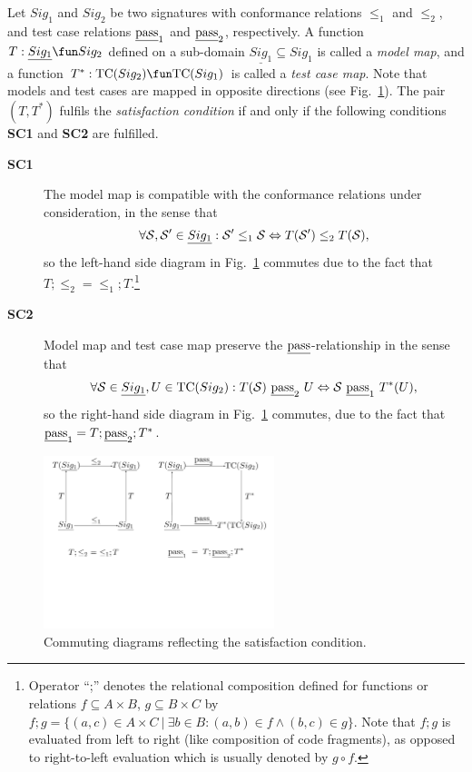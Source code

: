 Let $Sig_1$ and $Sig_2$ be two signatures with conformance relations $\le_1$ and $\le_2$,
and test case relations $\underline{\text{pass}}_1$ and $\underline{\text{pass}}_2$, respectively. 
A function $T:\underline{Sig_1} \fun Sig_2$ defined on a sub-domain $\underline{Sig_1} \subseteq Sig_1$  
 is called
a \emph{model map}, and a function $T^*:\tc(Sig_2) \fun \tc(Sig_1)$ is called a \emph{test case map}. Note that models and test cases are mapped in opposite directions 
(see Fig.~\ref{fig:satisfaction-relation}).
The pair $(T,T^*)$ fulfils the \emph{satisfaction condition} if and only if the following conditions {\bf SC1} and {\bf SC2} are fulfilled.
\begin{description}
\item[\bf SC1] The model map is compatible with the conformance relations under consideration, in the sense that
$$
\forall {\cal S},{\cal S}'\in \underline{Sig_1}: {\cal S}' \le_1 {\cal S} \Leftrightarrow 
T({\cal S}') \le_2 T({\cal S}),
$$
so   the left-hand side diagram   in Fig.~\ref{fig:satisfaction-relation} commutes due to the fact that
$T;\le_2 = \le_1;T$.\footnote{Operator ``;'' denotes the relational composition defined for
functions or relations $f\subseteq A\times B$, $g\subseteq B\times C$ by 
$f;g = \{(a,c)\in A\times C~|~\exists b\in B: (a,b)\in f \wedge (b,c)\in g\}$.
Note that $f;g$ is evaluated from left to right (like composition of code fragments), 
as opposed to right-to-left evaluation which is usually denoted by $g\circ f$.}

\item[\bf SC2] Model map and test case map preserve the $\underline{\text{pass}}$-relationship in the sense that
$$
\forall {\cal S}\in \underline{Sig_1}, U \in\tc(Sig_2): T({\cal S})\ \pass_2\ U \Leftrightarrow {\cal S}\ \pass_1\ T^*(U), 
$$
so the right-hand side diagram   in Fig.~\ref{fig:satisfaction-relation} commutes, due to the fact that
$\underline{\text{pass}}_1 = T;\underline{\text{pass}}_2;T^*$. 
\end{description}

\begin{figure}
\centering
\includegraphics[width=0.6\textwidth]{satisfaction-condition.pdf}
\vspace*{-20mm}
 \caption{Commuting diagrams reflecting the satisfaction condition.}
 \label{fig:satisfaction-relation}
 \end{figure}

